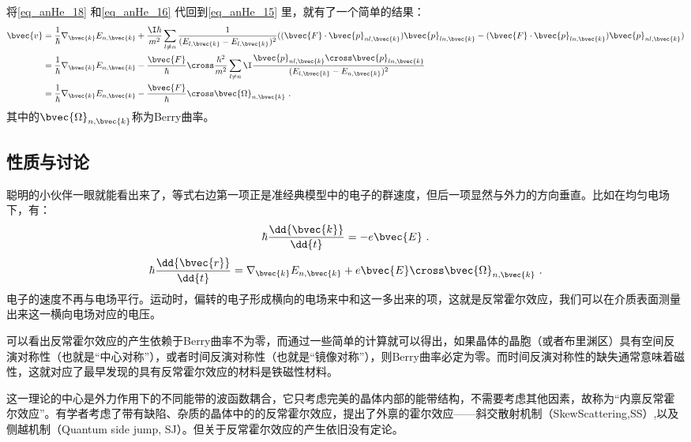 将\autoref{eq_anHe_18} 和\autoref{eq_anHe_16} 代回到\autoref{eq_anHe_15} 里，就有了一个简单的结果：
\begin{equation}
\begin{aligned}
\bvec{v}&=\frac{1}{\hbar}\nabla_{\bvec{k}}E_{n,\bvec{k}}+\frac{\I\hbar}{m^2}\sum_{l\neq n}\frac{1}{(E_{l,\bvec{k}}-E_{l,\bvec{k}})^2}((\bvec{F}\cdot\bvec{p}_{nl,\bvec{k}})\bvec{p}_{ln,\bvec{k}}-(\bvec{F}\cdot\bvec{p}_{ln,\bvec{k}})\bvec{p}_{nl,\bvec{k}})\\
&=\frac{1}{\hbar}\nabla_{\bvec{k}}E_{n,\bvec{k}}-\frac{\bvec{F}}{\hbar}\cross\frac{\hbar^2}{m^2}\sum_{l\neq n}\I\frac{\bvec{p}_{nl,\bvec{k}}\cross\bvec{p}_{ln,\bvec{k}}}{(E_{l,\bvec{k}}-E_{n,\bvec{k}})^2}\\
&=\frac{1}{\hbar}\nabla_{\bvec{k}}E_{n,\bvec{k}}-\frac{\bvec{F}}{\hbar}\cross\bvec{\Omega}_{n,\bvec{k}}~.
\end{aligned}
\end{equation}
其中的$\bvec{\Omega}_{n,\bvec{k}}$称为Berry曲率。

\subsection{性质与讨论}
聪明的小伙伴一眼就能看出来了，等式右边第一项正是准经典模型中的电子的群速度，但后一项显然与外力的方向垂直。比如在均匀电场下，有：
\begin{equation}
\hbar\frac{\dd{\bvec{k}}}{\dd{t}}=-e\bvec{E}~.
\end{equation}
\begin{equation}
\hbar\frac{\dd{\bvec{r}}}{\dd{t}}=\nabla_{\bvec{k}}E_{n,\bvec{k}}+e\bvec{E}\cross\bvec{\Omega}_{n,\bvec{k}}~.
\end{equation}
电子的速度不再与电场平行。运动时，偏转的电子形成横向的电场来中和这一多出来的项，这就是反常霍尔效应，我们可以在介质表面测量出来这一横向电场对应的电压。

可以看出反常霍尔效应的产生依赖于Berry曲率不为零，而通过一些简单的计算就可以得出，如果晶体的晶胞（或者布里渊区）具有空间反演对称性（也就是“中心对称”），或者时间反演对称性（也就是“镜像对称”），则Berry曲率必定为零。而时间反演对称性的缺失通常意味着磁性，这就对应了最早发现的具有反常霍尔效应的材料是铁磁性材料。

这一理论的中心是外力作用下的不同能带的波函数耦合，它只考虑完美的晶体内部的能带结构，不需要考虑其他因素，故称为“内禀反常霍尔效应”。有学者考虑了带有缺陷、杂质的晶体中的的反常霍尔效应，提出了外禀的霍尔效应——斜交散射机制（SkewScattering,SS）,以及侧越机制（Quantum side jump, SJ）。但关于反常霍尔效应的产生依旧没有定论。





